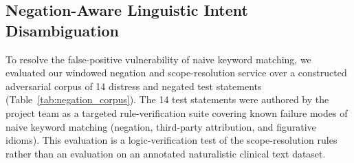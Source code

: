 \documentclass[10pt, conference, letterpaper]{IEEEtran}
\begin{document}
\subsection{Negation-Aware Linguistic Intent Disambiguation}

To resolve the false-positive vulnerability of naive keyword matching, we
evaluated our windowed negation and scope-resolution service over a constructed
adversarial corpus of 14 distress and negated test statements
(Table~\ref{tab:negation_corpus}).
The 14 test statements were authored by the project team as a targeted rule-verification
suite covering known failure modes of naive keyword matching (negation, third-party
attribution, and figurative idioms).
This evaluation is a logic-verification test of the scope-resolution rules rather
than an evaluation on an annotated naturalistic clinical text dataset.
\end{document}
